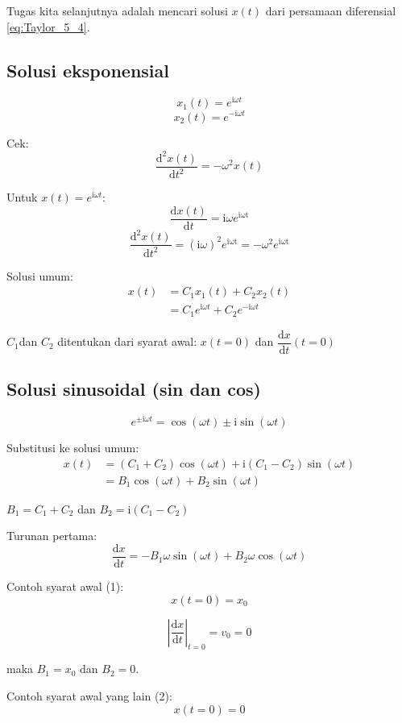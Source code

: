 Tugas kita selanjutnya adalah mencari solusi $x(t)$ dari persamaan diferensial
\eqref{eq:Taylor_5_4}.

\subsection*{Solusi eksponensial}

\[
x_{1}(t)=e^{\mathrm{i}\omega t}
\]
\[
x_{2}(t)=e^{-\mathrm{i}\omega t}
\]

Cek:
\[
\frac{\mathrm{d}^{2}x(t)}{\mathrm{d}t^{2}}=-\omega^{2}x(t)
\]

Untuk $x(t)=e^{\mathrm{i}\omega t}$:
\[
\frac{\mathrm{d}x(t)}{\mathrm{d}t}=\mathrm{i}\omega e^{\mathrm{i\omega t}}
\]
\[
\frac{\mathrm{d}^{2}x(t)}{\mathrm{d}t^{2}}=(\mathrm{i}\omega)^{2}e^{\mathrm{i\omega t}}=-\omega^{2}e^{\mathrm{i\omega t}}
\]

Solusi umum:
\begin{align*}
x(t) & =C_{1}x_{1}(t)+C_{2}x_{2}(t)\\
 & =C_{1}e^{\mathrm{i}\omega t}+C_{2}e^{-\mathrm{i}\omega t}
\end{align*}

$C_{1}$dan $C_{2}$ ditentukan dari syarat awal: $x(t=0)$ dan $\dfrac{\mathrm{d}x}{\mathrm{d}t}(t=0)$

\subsection*{Solusi sinusoidal (sin dan cos)}

\[
e^{\pm\mathrm{i}\omega t}=\cos(\omega t)\pm\mathrm{i}\sin(\omega t)
\]

Substitusi ke solusi umum:
\begin{align*}
x(t) & =(C_{1}+C_{2})\cos(\omega t)+\mathrm{i}(C_{1}-C_{2})\sin(\omega t)\\
 & =B_{1}\cos(\omega t)+B_{2}\sin(\omega t)
\end{align*}

$B_{1}=C_{1}+C_{2}$ dan $B_{2}=\mathrm{i}(C_{1}-C_{2})$

Turunan pertama:
\[
\frac{\mathrm{d}x}{\mathrm{d}t}=-B_{1}\omega\sin(\omega t)+B_{2}\omega\cos(\omega t)
\]

Contoh syarat awal (1):
\[
x(t=0)=x_{0}
\]

\[
\left|\frac{\mathrm{d}x}{\mathrm{d}t}\right|_{t=0}=v_{0}=0
\]

maka $B_{1}=x_{0}$ dan $B_{2}=0$.

Contoh syarat awal yang lain (2):
\[
x(t=0)=0
\]

